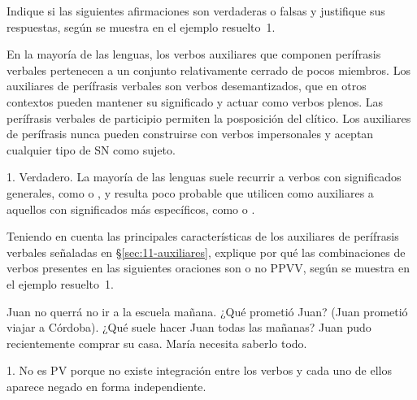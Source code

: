 \begin{ejercicio}\label{ej:11-vf}
Indique si las siguientes afirmaciones son verdaderas o falsas y justifique sus
respuestas, según se muestra en el ejemplo resuelto~1.

\begin{exe}
  \ex En la mayoría de las lenguas, los verbos auxiliares que componen
      perífrasis verbales pertenecen a un conjunto relativamente cerrado de pocos
      miembros.
  \ex Los auxiliares de perífrasis verbales son verbos desemantizados, que en
      otros contextos pueden mantener su significado y actuar como verbos
      plenos.
  \ex Las perífrasis verbales de participio permiten la posposición del clítico.
  \ex Los auxiliares de perífrasis nunca pueden construirse con verbos
      impersonales y aceptan cualquier tipo de SN como sujeto.
\end{exe}

\begin{resuelto}
1. Verdadero. La mayoría de las lenguas suele recurrir a verbos con significados
generales, como  o , y resulta poco probable que
utilicen como auxiliares a aquellos con significados más específicos, como
 o .
\end{resuelto}
\end{ejercicio}

\begin{ejercicio}\label{ej:11-caracteristicas}
Teniendo en cuenta las principales características de los auxiliares de
perífrasis verbales señaladas en §\ref{sec:11-auxiliares}, explique por qué las
combinaciones de verbos presentes en las siguientes oraciones son o no PPVV,
según se muestra en el ejemplo resuelto~1.

\begin{exe}
  \ex Juan no querrá no ir a la escuela mañana.
  \ex ¿Qué prometió Juan? (Juan prometió viajar a Córdoba).
  \ex ¿Qué suele hacer Juan todas las mañanas?
  \ex Juan pudo recientemente comprar su casa.
  \ex María necesita saberlo todo.
\end{exe}

\begin{resuelto}
1. No es PV porque no existe integración entre los verbos y cada uno de ellos
aparece negado en forma independiente.
\end{resuelto}
\end{ejercicio}


